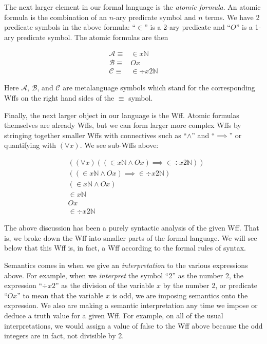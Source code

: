 \documentclass[12pt]{article}
\newcommand{\mc}[1]{\mathcal{#1}}
\newcommand{\qq}[1]{``#1''}
\begin{document}
The next larger element in our formal language is the \textit{atomic formula}.
An atomic formula is the combination of an $n$-ary predicate symbol and $n$ terms.
We have 2 predicate symbols in the above formula: \qq{$\in$} is a 2-ary predicate and \qq{$O$} is a 1-ary predicate symbol.
The atomic formulas are then

\begin{align}
\mc{A} \equiv& \in x \mathbb{N}\\
\mc{B} \equiv& Ox\\
\mc{C} \equiv& \in \div x2 \mathbb{N}
\end{align}

Here $\mc{A}$, $\mc{B}$, and $\mc{C}$ are metalanguage symbols which stand for the corresponding Wffs on the right hand sides of the $\equiv$ symbol.

Finally, the next larger object in our language is the Wff.
Atomic formulas themselves are already Wffs, but we can form larger more complex Wffs by stringing together smaller Wffs with connectives such as \qq{$\land$} and \qq{$\implies$} or quantifying with $(\forall x)$.
We see sub-Wffs above:

\begin{align}
& ((\forall x)((\in x \mathbb{N} \land Ox)\implies \in \div x 2 \mathbb{N})) \\
& ((\in x \mathbb{N} \land Ox)\implies \in \div x 2 \mathbb{N}) \\
& (\in x \mathbb{N} \land Ox)\\
& \in x \mathbb{N}\\
& Ox \\
&  \in \div x 2 \mathbb{N}
\end{align}

The above discussion has been a purely syntactic analysis of the given Wff.
That is, we broke down the Wff into smaller parts of the formal language.
We will see below that this Wff is, in fact, a Wff according to the formal rules of syntax.

Semantics comes in when we give an \textit{interpretation} to the various expressions above.
For example, when we \textit{interpret} the symbol \qq{2} as the number 2, the expression \qq{$\div x 2$} as the division of the variable $x$ by the number 2, or predicate \qq{$Ox$} to mean that the variable $x$ is odd, we are imposing semantics onto the expression.
We also are making a semantic interpretation any time we impose or deduce a truth value for a given Wff.
For example, on all of the usual interpretations, we would assign a value of false to the Wff above because the odd integers are in fact, not divisible by 2.
\end{document}
